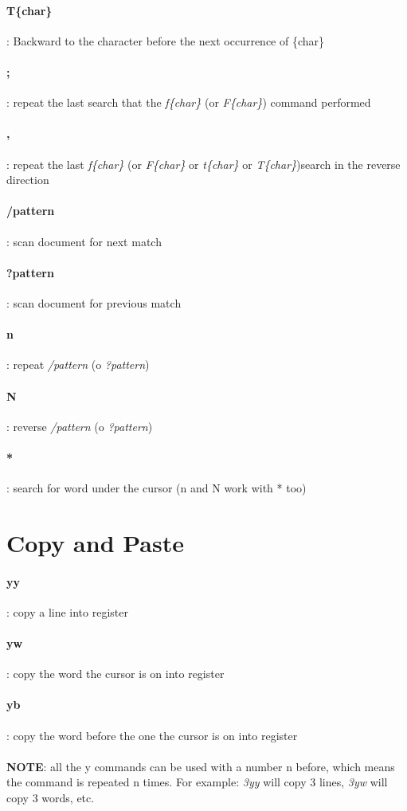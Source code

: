 \documentclass[10pt,letterpaper]{book}
\begin{document}
\paragraph{T\{char\}}: Backward to the character before the next occurrence of \{char\}
\paragraph{;}: repeat the last search that the \textit{f\{char\}} (or \textit{F\{char\}}) command performed
\paragraph{,}: repeat the last \textit{f\{char\}} (or \textit{F\{char\}} or \textit{t\{char\}} or \textit{T\{char\}})search in the reverse direction
\paragraph{/pattern}: scan document for next match
\paragraph{?pattern}: scan document for previous match
\paragraph{n}: repeat \textit{/pattern} (o \textit{?pattern})
\paragraph{N}: reverse \textit{/pattern} (o \textit{?pattern})
\paragraph{*}: search for word under the cursor (n and N work with * too)
\section{Copy and Paste}
\paragraph{yy}: copy a line into register
\paragraph{yw}: copy the word the cursor is on into register
\paragraph{yb}: copy the word before the one the cursor is on into register\\ \\
\textbf{NOTE}: all the y commands can be used with a number n before, which means the command is repeated n times. For example: \textit{3yy} will copy 3 lines, \textit{3yw} will copy 3 words, etc.
\end{document}
